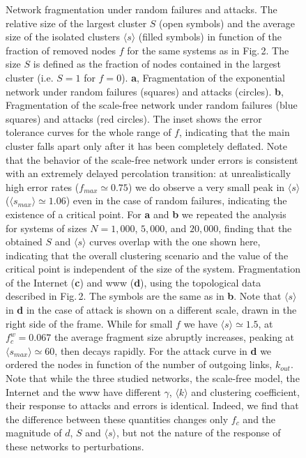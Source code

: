 \begin{figure}[htb]
\vspace{-1in}
\renewcommand\baselinestretch{0.90}
\caption{ Network fragmentation under random failures and attacks. The relative size of the largest cluster $S$ (open symbols) and the average size of the isolated clusters $\langle s \rangle$ (filled symbols) in function of the fraction of removed nodes $f$ for the same systems as in Fig.$\,$2. The size $S$ is defined as the fraction of nodes contained in the largest cluster (i.e. $S=1$ for $f=0$). {\bf a}, Fragmentation of the exponential network under random failures (squares) and attacks (circles). {\bf b}, Fragmentation of the scale-free network under random failures (blue squares) and attacks (red circles). The inset shows the error tolerance curves for the whole range of $f$, indicating that the main cluster falls apart only after it has been completely deflated. Note that the behavior of the scale-free network under errors is consistent with an extremely delayed percolation transition: at unrealistically high error rates ($f_{max}\simeq 0.75$) we do observe a very small peak in $\langle s\rangle$ ($\langle s_{max}\rangle\simeq 1.06$) even in the case of random failures, indicating the existence of a critical point. For {\bf a} and {\bf b} we repeated the analysis for systems of sizes $N=1,000$, $5,000$, and $20,000$, finding that the obtained $S$ and $\langle s\rangle$ curves overlap with the one shown here, indicating that the overall clustering scenario and the value of the critical point is independent of the size of the system. Fragmentation of the Internet ({\bf c}) and www ({\bf d}), using the topological data described in Fig.$\,$2. The symbols are the same as in {\bf b}. Note that $\langle s\rangle$ in {\bf d} in the case of attack is shown on a different scale, drawn in the right side of the frame. While  for small $f$ we have $\langle s\rangle\simeq 1.5$, at $f_c^w=0.067$ the average fragment size abruptly increases, peaking at $\langle s_{max}\rangle\simeq 60$, then decays rapidly. For the attack curve in {\bf d} we ordered the nodes in function of the number  of outgoing   links, $k_{out}$. Note that while the three studied networks, the  scale-free model,  the Internet and the www have different  $\gamma$, $\langle k\rangle$ and  clustering coefficient\protect\cite{small_world}, their response to attacks and errors is identical.  Indeed, we find that the difference between these quantities changes  only $f_c$ and the magnitude  of $d$, $S$ and $\langle s\rangle$,  but not the nature of the response of these networks to perturbations.}
\end{figure}

